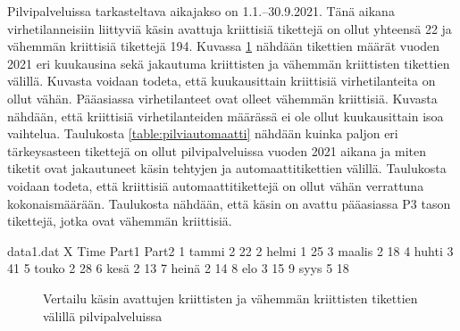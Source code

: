Pilvipalveluissa tarkasteltava aikajakso on 1.1.--30.9.2021. Tänä aikana virhetilanneisiin liittyviä käsin avattuja kriittisiä tikettejä on ollut yhteensä 22 ja vähemmän kriittisiä tikettejä 194. Kuvassa \ref{fig:pilvitiketit} nähdään tikettien määrät vuoden 2021 eri kuukausina sekä jakautuma kriittisten ja vähemmän kriittisten tikettien välillä. Kuvasta voidaan todeta, että kuukausittain kriittisiä virhetilanteita on ollut vähän. Pääasiassa virhetilanteet ovat olleet vähemmän kriittisiä. Kuvasta nähdään, että kriittisiä virhetilanteiden määrässä ei ole ollut kuukausittain isoa vaihtelua. Taulukosta \ref{table:pilviautomaatti} nähdään kuinka paljon eri tärkeysasteen tikettejä on ollut pilvipalveluissa vuoden 2021 aikana ja miten tiketit ovat jakautuneet käsin tehtyjen ja automaattitikettien välillä. Taulukosta voidaan todeta, että kriittisiä automaattitikettejä on ollut vähän verrattuna kokonaismäärään. Taulukosta nähdään, että käsin on avattu pääasiassa P3 tason tikettejä, jotka ovat vähemmän kriittisiä.

\begin{filecontents}{data1.dat}
X Time  	Part1  Part2
1 tammi  	2	    22
2 helmi		1	    25
3 maalis	2	    18
4 huhti		3	    41
5 touko		2	    28
6 kesä		2	    13
7 heinä		2	    14
8 elo       3       15
9 syys      5       18
\end{filecontents}

\begin{figure}[ht]
\caption{Vertailu käsin avattujen kriittisten ja vähemmän kriittisten tikettien välillä pilvipalveluissa}
\label{fig:pilvitiketit}
\end{figure}

